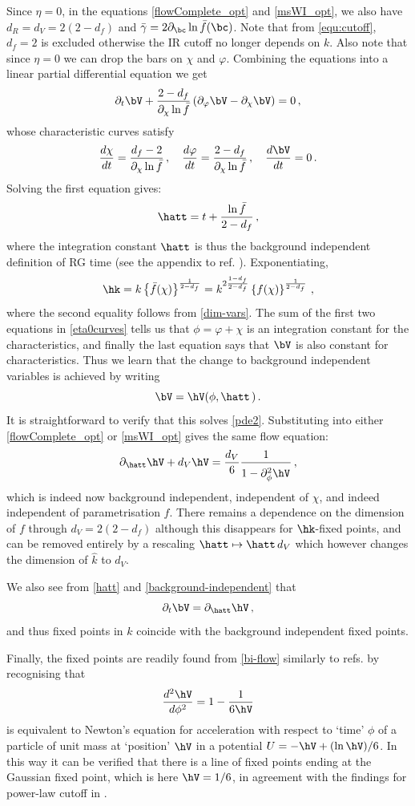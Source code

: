 \documentclass[11pt]{book} %
\newcommand{\be}{\begin{equation}}
\newcommand{\ee}{\end{equation}}
\newcommand{\vp}{\varphi}
\begin{document}
Since $\eta=0$, in the equations \eqref{flowComplete_opt} and \eqref{msWI_opt}, we also have $d_R=d_V=2(2-d_f)$ and $\bar{\gamma}=2\partial_{\bc}\ln\bar{f}(\bc)$. Note that from \eqref{equ:cutoff}, $d_f=2$ is excluded otherwise the IR cutoff no longer depends on $k$. Also note that since $\eta=0$ we can drop the bars on $\chi$ and $\vp$.
Combining the equations into a linear partial differential equation we get
\be 
\label{pde2}
\partial_t\bV +\frac{2-d_f}{\partial_{\chi}\ln\bar{f}}\left(\partial_{\vp}\bV-\partial_{\chi}\bV\right) =0\,,
\ee
whose characteristic curves satisfy
\be 
\label{eta0curves}
\frac{d\chi}{dt}=\frac{d_f-2}{\partial_{\chi}\ln\bar{f}}\,,\quad\frac{d\vp}{dt}=\frac{2-d_f}{\partial_{\chi}\ln\bar{f}}\,,\quad \frac{d\bV}{dt}=0\,.
\ee
Solving the first equation gives:
\be 
\label{hatt}
\hatt = t+\frac{\ln\bar{f}}{2-d_f}\,,
\ee
where the integration constant $\hatt$ is thus the background independent definition of RG time (see the appendix to ref. \cite{Dietz:2015owa}). Exponentiating,
\be 
\hk = k \left\{\bar{f}(\chi)\right\}^{\frac{1}{2-d_f}} = k^{2\frac{1-d_f}{2-d_f}} \left\{f(\chi)\right\}^{\frac{1}{2-d_f}}\,,
\ee
where the second equality follows from \eqref{dim-vars}. The sum of the first two equations in \eqref{eta0curves} tells us that $\phi=\vp+\chi$ is an integration constant for the characteristics, and finally the last equation says that $\bV$ is also constant for characteristics. Thus we learn that the change to background independent variables is achieved by writing
\be 
\label{background-independent}
\bV = \hV(\phi,\hatt\,)\,.
\ee
It is straightforward to verify that this solves \eqref{pde2}. Substituting into either \eqref{flowComplete_opt} or \eqref{msWI_opt} gives the same flow equation:
\be 
\label{bi-flow}
\partial_{\hatt}\hV +d_V\hV = \frac{d_V}{6}\frac{1}{1-\partial^2_\phi\hV^{\vphantom{H^H}}}\,,
\ee
which is indeed now background independent, \ie independent of $\chi$, and indeed independent of parametrisation $f$. There remains a dependence on the dimension of $f$ through $d_V = 2(2-d_f)$ although this disappears for $\hk$-fixed points, and can be removed entirely by a rescaling $\hatt\mapsto \hatt\, d_V$ which however changes the dimension of $\hat{k}$ to $d_V$. 

We also see from \eqref{hatt} and \eqref{background-independent} that
\be 
\partial_t \bV = \partial_{\hatt} \hV\,,
\ee
and thus fixed points in $k$ coincide with the background independent fixed points. 

Finally, the fixed points are readily found from \eqref{bi-flow} similarly to refs. \cite{Dietz2016,Morris:1994jc} by recognising that 
\be 
\frac{d^2\hV}{d\phi^2} = 1-\frac{1}{6\hV}
\ee
is equivalent to Newton's equation for acceleration with respect to `time' $\phi$ of a particle of unit mass at `position' $\hV$ in a potential $U=-\hV+ (\ln\hV)/6$. In this way it can be verified that there is a line of fixed points ending at the Gaussian fixed point, which is here $\hV=1/6$, in agreement with the findings for power-law cutoff in \cite{Dietz2016}.
\end{document}
